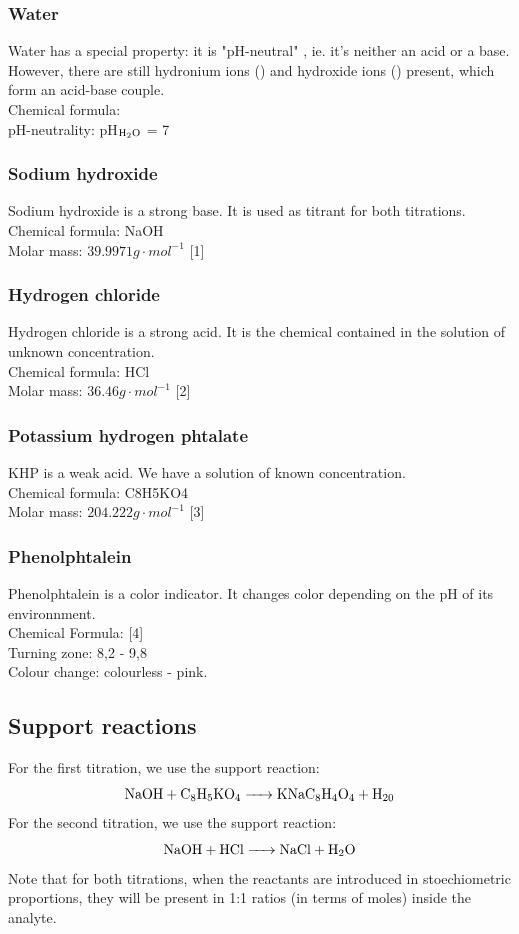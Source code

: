 \documentclass[twocolumn]{article}
\begin{document}
\subsubsection{Water}
Water has a special property: it is "pH-neutral" , ie. it's neither an acid or a base. However, there are still hydronium ions () and hydroxide ions () present, which form an acid-base couple. \\
Chemical formula:  \\
pH-neutrality: pH$_{\ce{H2O}}$ = 7
\subsubsection{Sodium hydroxide}
Sodium hydroxide is a strong base. It is used as titrant for both titrations.\\
Chemical formula: NaOH \\
Molar mass: $39.9971 g \cdot mol^{-1}$ [1] 
\subsubsection{Hydrogen chloride}
Hydrogen chloride is a strong acid. It is the chemical contained in the solution of unknown concentration.\\
Chemical formula: HCl\\
Molar mass: $36.46 g \cdot mol^{-1}$ [2]
\subsubsection{Potassium hydrogen phtalate}
KHP is a weak acid. We have a solution of known concentration.\\
Chemical formula: C8H5KO4\\
Molar mass: $204.222 g \cdot mol^{-1}$ [3]
\subsubsection{Phenolphtalein}
Phenolphtalein is a color indicator. It changes color depending on the pH of its environnment.\\
Chemical Formula:  [4]\\ 
Turning zone: 8,2 - 9,8\\
Colour change: colourless - pink. 
\subsection{Support reactions}
For the first titration, we use the support reaction:
\[ \ce{NaOH + C8H5KO4 -> KNaC8H4O4 + H20} \]
For the second titration, we use the support reaction:
\[ \ce{NaOH + HCl -> NaCl + H2O} \]
Note that for both titrations, when the reactants are introduced in stoechiometric proportions, they will be present in 1:1 ratios (in terms of moles) inside the analyte.
\end{document}
